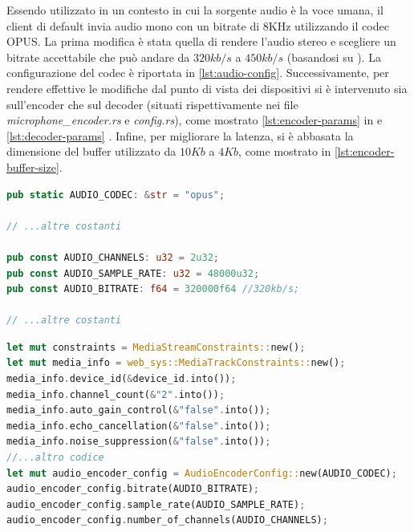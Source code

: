 \documentclass{article}
\begin{document}
Essendo utilizzato in un contesto in cui la sorgente audio è la voce umana, il 
client di default invia audio mono con un bitrate di 8KHz utilizzando il codec OPUS. La 
prima modifica è stata quella di rendere l'audio stereo e scegliere un bitrate accettabile
che può andare da $320 kb/s$ a $450 kb/s$ (basandosi su \cite{rfc6716}). La configurazione
del codec è riportata in \cref{lst:audio-config}. Successivamente, per rendere effettive le modifiche dal punto 
di vista dei dispositivi si è intervenuto sia sull'encoder che sul decoder (situati 
rispettivamente nei file \textit{microphone\_encoder.rs} e \textit{config.rs}), 
come mostrato \cref{lst:encoder-params} in e \cref{lst:decoder-params} . Infine, per migliorare la latenza, si è
abbasata la dimensione del buffer utilizzato da $10Kb$ a $4Kb$, come mostrato in
\cref{lst:encoder-buffer-size}. 

\begin{lstlisting}[language=Rust, style=boxed, label={lst:audio-config}, captionpos=b,caption={Configurazione utilizzata per trasmettere l'audio}]
pub static AUDIO_CODEC: &str = "opus";

// ...altre costanti

pub const AUDIO_CHANNELS: u32 = 2u32;
pub const AUDIO_SAMPLE_RATE: u32 = 48000u32;
pub const AUDIO_BITRATE: f64 = 320000f64 //320kb/s;

// ...altre costanti
\end{lstlisting}
\begin{lstlisting}[language=Rust, style=boxed, label={lst:encoder-params}, captionpos=b,caption={Configurazione audio stereo per l'encoder OPUS}]
let mut constraints = MediaStreamConstraints::new();
let mut media_info = web_sys::MediaTrackConstraints::new();
media_info.device_id(&device_id.into());
media_info.channel_count(&"2".into());
media_info.auto_gain_control(&"false".into());
media_info.echo_cancellation(&"false".into());
media_info.noise_suppression(&"false".into());
//...altro codice
let mut audio_encoder_config = AudioEncoderConfig::new(AUDIO_CODEC);
audio_encoder_config.bitrate(AUDIO_BITRATE);
audio_encoder_config.sample_rate(AUDIO_SAMPLE_RATE);
audio_encoder_config.number_of_channels(AUDIO_CHANNELS);

\end{lstlisting}
\end{document}
